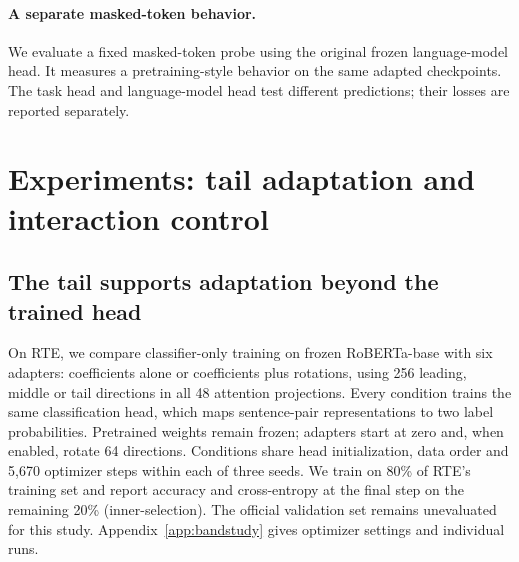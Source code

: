 \documentclass{article}
\begin{document}
\paragraph{A separate masked-token behavior.}
We evaluate a fixed masked-token probe using the original frozen language-model head. It measures a pretraining-style behavior on the same adapted checkpoints. The task head and language-model head test different predictions; their losses are reported separately.

\section{Experiments: tail adaptation and interaction control}
\label{sec:experiments}

\subsection{The tail supports adaptation beyond the trained head}
\label{sec:tailstudy}


On RTE, we compare classifier-only training on frozen RoBERTa-base with six adapters: coefficients alone or coefficients plus rotations, using 256 leading, middle or tail directions in all 48 attention projections. Every condition trains the same classification head, which maps sentence-pair representations to two label probabilities. Pretrained weights remain frozen; adapters start at zero and, when enabled, rotate 64 directions. Conditions share head initialization, data order and 5{,}670 optimizer steps within each of three seeds. We train on 80\% of RTE's training set and report accuracy and cross-entropy at the final step on the remaining 20\% (inner-selection). The official validation set remains unevaluated for this study. Appendix~\ref{app:bandstudy} gives optimizer settings and individual runs.
\end{document}
